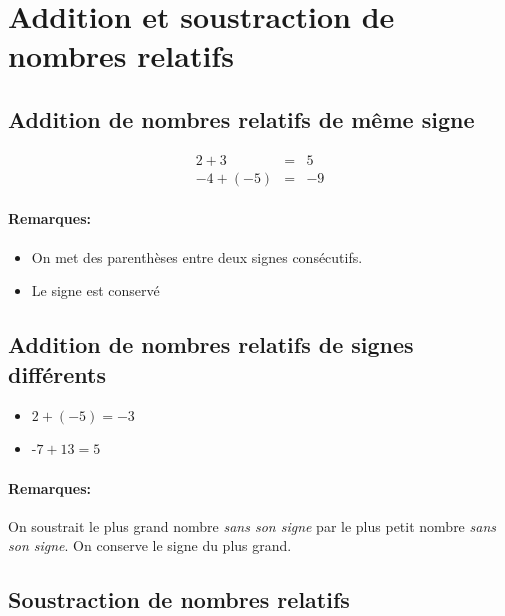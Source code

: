\documentclass[paper=a4, fontsize=10pt]{scrartcl} %
\begin{document}
\section{Addition et soustraction de nombres relatifs}
\begin{multicols}{2}
  \subsection{Addition de nombres relatifs de même signe}

  \begin{eqnarray*}
    2 + 3 &=& 5\\
    -4 + (-5) &=& -9
  \end{eqnarray*}

  \paragraph{Remarques: } 
  \begin{itemize}
  \item On met des parenthèses entre deux signes consécutifs.
  \item Le signe est conservé
  \end{itemize}

  \subsection{Addition de nombres relatifs de signes différents}

  \begin{itemize}[label=$\Diamond$]
  \item $2 + (-5) = -3$
  \item -$7 + 13 = 5$
  \end{itemize}

  \paragraph{Remarques: }On soustrait le plus grand nombre \textit{sans son signe} par le plus petit nombre \textit{sans son signe}. On conserve le signe du plus grand.
\end{multicols}

\subsection{Soustraction de nombres relatifs}
\end{document}
